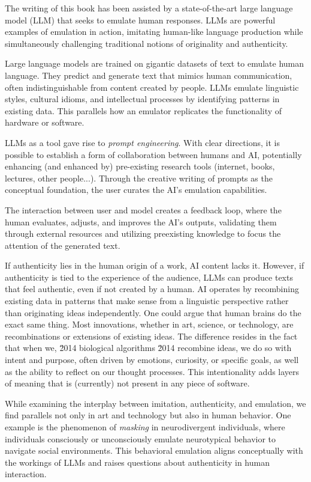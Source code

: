 The writing of this book has been assisted by a state-of-the-art large language model (LLM) that seeks to emulate human responses. LLMs are powerful examples of emulation in action, imitating human-like language production while simultaneously challenging traditional notions of originality and authenticity.

Large language models are trained on gigantic datasets of text to emulate human language. They predict and generate text that mimics human communication, often indistinguishable from content created by people. LLMs emulate linguistic styles, cultural idioms, and intellectual processes by identifying patterns in existing data. This parallels how an emulator replicates the functionality of hardware or software.

LLMs as a tool gave rise to \textit{prompt engineering}. With clear directions, it is possible to establish a form of collaboration between humans and AI, potentially enhancing (and enhanced by) pre-existing research tools (internet, books, lectures, other people...). Through the creative writing of prompts as the conceptual foundation, the user curates the AI's emulation capabilities.

The interaction between user and model creates a feedback loop, where the human evaluates, adjusts, and improves the AI's outputs, validating them through external resources and utilizing preexisting knowledge to focus the attention of the generated text.

If authenticity lies in the human origin of a work, AI content lacks it. However, if authenticity is tied to the experience of the audience, LLMs can produce texts that feel authentic, even if not created by a human. AI operates by recombining existing data in patterns that make sense from a linguistic perspective rather than originating ideas independently. One could argue that human brains do the exact same thing. Most innovations, whether in art, science, or technology, are recombinations or extensions of existing ideas. The difference resides in the fact that when we, \u2014 biological algorithms \u2014 recombine ideas, we do so with intent and purpose, often driven by emotions, curiosity, or specific goals, as well as the ability to reflect on our thought processes. This intentionality adds layers of meaning that is (currently) not present in any piece of software.

While examining the interplay between imitation, authenticity, and emulation, we find parallels not only in art and technology but also in human behavior. One example is the phenomenon of \textit{masking} in neurodivergent individuals, where individuals consciously or unconsciously emulate neurotypical behavior to navigate social environments. This behavioral emulation aligns conceptually with the workings of LLMs and raises questions about authenticity in human interaction.

